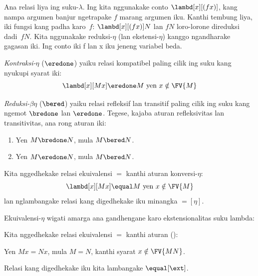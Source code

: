 \documentclass[../../../include/open-logic-section]{subfiles}
\begin{document}

Ana relasi liya ing suku-$\lambda$.
Ing  kita nggunakake
conto $\lambd[x][(fx)]$, kang
nampa argumen banjur ngetrapake
$f$ marang argumen iku.
Kanthi tembung liya, iki fungsi
kang padha karo~$f$:
$\lambd[x][(fx)]N$ lan $fN$
loro-lorone direduksi dadi~$fN$.
Kita nggunakake reduksi-$\eta$
(lan ekstensi-$\eta$) kanggo
ngandharake gagasan iki. Ing conto iki f lan x iku jeneng variabel beda.

\begin{defn}
  \emph{Kontraksi-$\eta$} ($\eredone$)
  yaiku relasi kompatibel paling cilik
  ing suku kang nyukupi syarat iki:
  \[
    \lambd[x][M x] \eredone M \text{ yen } x \notin \FV{M}
  \]
\end{defn}

\begin{defn} 
  \emph{Reduksi-$\beta\eta$} ($\bered$)
  yaiku relasi refleksif lan transitif
  paling cilik ing suku kang ngemot
  $\bredone$ lan $\eredone$.
  Tegese, kajaba aturan refleksivitas
  lan transitivitas, ana rong aturan iki:
  \begin{enumerate}
  \item Yen $M \bredone N$, mula $M \bered N$. 
  \item Yen $M \eredone N$, mula $M \bered N$. 
  \end{enumerate}

\end{defn}

\begin{defn}
  Kita nggedhekake relasi ekuivalensi
  $\equal$ kanthi aturan konversi-$\eta$:
  \[
  \lambd[x][M x] \equal M \text{ yen } x \notin \FV{M}
  \]
  lan nglambangake relasi kang
  digedhekake iku minangka
  $\equal[\eta]$.
\end{defn}

Ekuivalensi-$\eta$ wigati amarga
ana gandhengane karo ekstensionalitas
suku lambda:

\begin{defn}[Ekstensionalitas]
  Kita nggedhekake relasi ekuivalensi
  $\equal$ kanthi aturan (\ext):
  \begin{center}
  Yen $Mx \equal Nx$, mula $M \equal N$,
  kanthi syarat $x \notin \FV{MN}$.
  \end{center}
  Relasi kang digedhekake iku
  kita lambangake $\equal[\ext]$.
\end{defn}
\end{document}
